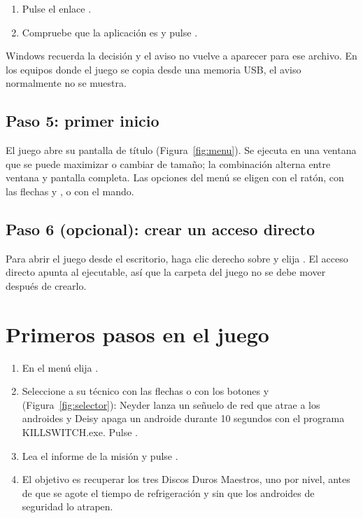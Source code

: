 \documentclass[stu,letterpaper,12pt,donotrepeattitle,floatsintext]{apa7}
\begin{document}
\begin{enumerate}
  \item Pulse el enlace .
  \item Compruebe que la aplicación es  y pulse .
\end{enumerate}

Windows recuerda la decisión y el aviso no vuelve a aparecer para ese archivo. En los equipos donde
el juego se copia desde una memoria USB, el aviso normalmente no se muestra.

\subsection{Paso 5: primer inicio}

El juego abre su pantalla de título (Figura~\ref{fig:menu}). Se ejecuta en una ventana que se puede
maximizar o cambiar de tamaño; la combinación  alterna entre ventana y pantalla
completa. Las opciones del menú se eligen con el ratón, con las flechas y , o con el mando.


\subsection{Paso 6 (opcional): crear un acceso directo}

Para abrir el juego desde el escritorio, haga clic derecho sobre  y elija
 \textrightarrow{}  \textrightarrow{}
. El acceso directo apunta al ejecutable, así que la carpeta
del juego no se debe mover después de crearlo.

\section{Primeros pasos en el juego}

\begin{enumerate}
  \item En el menú elija .
  \item Seleccione a su técnico con las flechas o con los botones \cod{<} y \cod{>}
        (Figura~\ref{fig:selector}): Neyder lanza un señuelo de red que atrae a los androides y Deisy
        apaga un androide durante 10 segundos con el programa KILLSWITCH.exe. Pulse
        .
  \item Lea el informe de la misión y pulse .
  \item El objetivo es recuperar los tres Discos Duros Maestros, uno por nivel, antes de que se
        agote el tiempo de refrigeración y sin que los androides de seguridad lo atrapen.
\end{enumerate}
\end{document}

